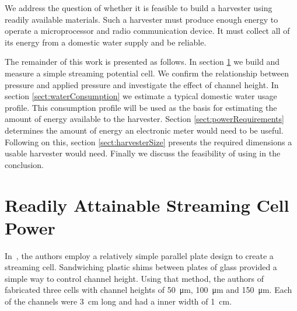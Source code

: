 \documentclass[10pt,final,journal]{IEEEtran}
\begin{document}
    We address the question of whether it is feasible to build a harvester using readily available materials.
    Such a harvester must produce enough energy to operate a microprocessor and radio communication device.
    It must collect all of its energy from a domestic water supply and be reliable.

    The remainder of this work is presented as follows.
    In section \ref{sect:streamingCell} we build and measure a simple streaming potential cell.
    We confirm the relationship between pressure and applied pressure and investigate the effect of channel height.
    In section \ref{sect:waterConsumption} we estimate a typical domestic water usage profile.
    This consumption profile will be used as the basis for estimating the amount of energy available to the harvester.
    Section \ref{sect:powerRequirements} determines the amount of energy an electronic meter would need to be useful.
    Following on this, section \ref{sect:harvesterSize} presents the required dimensions a usable harvester would need.
    Finally we discuss the feasibility of using in the conclusion.

    \section{Readily Attainable Streaming Cell Power} \label{sect:streamingCell}
    In~\cite{Gu2000}, the authors employ a relatively simple parallel plate design to create a streaming cell.
    Sandwiching plastic shims between plates of glass provided a simple way to control channel height.
    Using that method, the authors of~\cite{Gu2000} fabricated three cells with channel heights of \SI{50}{\micro\metre}, \SI{100}{\micro\metre} and \SI{150}{\micro\metre}.
    Each of the channels were \SI{3}{\centi\metre} long and had a inner width of \SI{1}{\centi\metre}.
\end{document}
